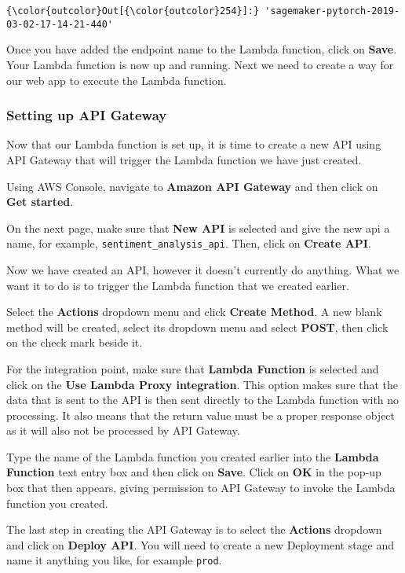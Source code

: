 \documentclass[11pt]{article}
\begin{document}
\begin{Verbatim}[commandchars=\\\{\}]
{\color{outcolor}Out[{\color{outcolor}254}]:} 'sagemaker-pytorch-2019-03-02-17-14-21-440'
\end{Verbatim}
            
    Once you have added the endpoint name to the Lambda function, click on
\textbf{Save}. Your Lambda function is now up and running. Next we need
to create a way for our web app to execute the Lambda function.

\hypertarget{setting-up-api-gateway}{%
\subsubsection{Setting up API Gateway}\label{setting-up-api-gateway}}

Now that our Lambda function is set up, it is time to create a new API
using API Gateway that will trigger the Lambda function we have just
created.

Using AWS Console, navigate to \textbf{Amazon API Gateway} and then
click on \textbf{Get started}.

On the next page, make sure that \textbf{New API} is selected and give
the new api a name, for example, \texttt{sentiment\_analysis\_api}.
Then, click on \textbf{Create API}.

Now we have created an API, however it doesn't currently do anything.
What we want it to do is to trigger the Lambda function that we created
earlier.

Select the \textbf{Actions} dropdown menu and click \textbf{Create
Method}. A new blank method will be created, select its dropdown menu
and select \textbf{POST}, then click on the check mark beside it.

For the integration point, make sure that \textbf{Lambda Function} is
selected and click on the \textbf{Use Lambda Proxy integration}. This
option makes sure that the data that is sent to the API is then sent
directly to the Lambda function with no processing. It also means that
the return value must be a proper response object as it will also not be
processed by API Gateway.

Type the name of the Lambda function you created earlier into the
\textbf{Lambda Function} text entry box and then click on \textbf{Save}.
Click on \textbf{OK} in the pop-up box that then appears, giving
permission to API Gateway to invoke the Lambda function you created.

The last step in creating the API Gateway is to select the
\textbf{Actions} dropdown and click on \textbf{Deploy API}. You will
need to create a new Deployment stage and name it anything you like, for
example \texttt{prod}.
\end{document}
